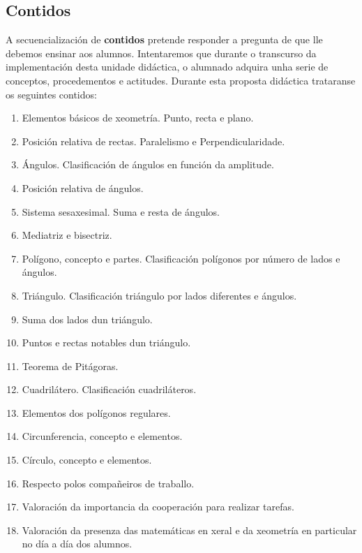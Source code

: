 \subsection{Contidos}\label{sec:contidos}
A secuencialización de \textbf{contidos} pretende responder a pregunta de que lle debemos ensinar aos alumnos. Intentaremos que durante o transcurso da implementación desta unidade didáctica, o alumnado adquira unha serie de conceptos, procedementos e actitudes. Durante esta proposta didáctica trataranse os seguintes contidos:

\begin{enumerate}[label=\bfseries Con\arabic*]
  \item\label{con1} Elementos básicos de xeometría. Punto, recta e plano.
  \item\label{con2} Posición relativa de rectas. Paralelismo e Perpendicularidade.
  \item\label{con3} Ángulos. Clasificación de ángulos en función da amplitude.
  \item\label{con4} Posición relativa de ángulos.
  \item\label{con5} Sistema sesaxesimal. Suma e resta de ángulos.
  \item\label{con6} Mediatriz e bisectriz.
  \item\label{con7} Polígono, concepto e partes. Clasificación polígonos por número de lados e ángulos.
  \item\label{con8} Triángulo. Clasificación triángulo por lados diferentes e ángulos.
  \item\label{con9} Suma dos lados dun triángulo.
  \item\label{con10} Puntos e rectas notables dun triángulo.
  \item\label{con11} Teorema de Pitágoras.
  \item\label{con12} Cuadrilátero. Clasificación cuadriláteros.
  \item\label{con13} Elementos dos polígonos regulares.
  \item\label{con14} Circunferencia, concepto e elementos.
  \item\label{con15} Círculo, concepto e elementos.
  \item\label{con16} Respecto polos compañeiros de traballo.
  \item\label{con16} Valoración da importancia da cooperación para realizar tarefas.
  \item\label{con17} Valoración da presenza das matemáticas en xeral e da xeometría en particular no día a día dos alumnos.
\end{enumerate}
